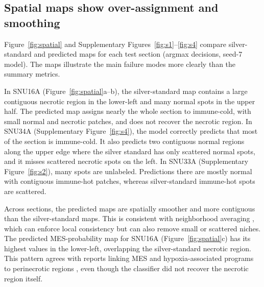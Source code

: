 \documentclass[11pt,letterpaper]{article}
\begin{document}
\subsection{Spatial maps show over-assignment and smoothing}

Figure~\ref{fig:spatial} and Supplementary Figures~\ref{fig:s1}--\ref{fig:s4} compare silver-standard and predicted maps for each test section (argmax decisions, seed-7 model). The maps illustrate the main failure modes more clearly than the summary metrics.

In SNU16A (Figure~\ref{fig:spatial}a--b), the silver-standard map contains a large contiguous necrotic region in the lower-left and many normal spots in the upper half. The predicted map assigns nearly the whole section to immune-cold, with small normal and necrotic patches, and does not recover the necrotic region. In SNU34A (Supplementary Figure~\ref{fig:s4}), the model correctly predicts that most of the section is immune-cold. It also predicts two contiguous normal regions along the upper edge where the silver standard has only scattered normal spots, and it misses scattered necrotic spots on the left. In SNU33A (Supplementary Figure~\ref{fig:s2}), many spots are unlabeled. Predictions there are mostly normal with contiguous immune-hot patches, whereas silver-standard immune-hot spots are scattered.

Across sections, the predicted maps are spatially smoother and more contiguous than the silver-standard maps. This is consistent with neighborhood averaging \cite{li2018deeper}, which can enforce local consistency but can also remove small or scattered niches. The predicted MES-probability map for SNU16A (Figure~\ref{fig:spatial}c) has its highest values in the lower-left, overlapping the silver-standard necrotic region. This pattern agrees with reports linking MES and hypoxia-associated programs to perinecrotic regions \cite{greenwald2024,neftel2019}, even though the classifier did not recover the necrotic region itself.
\end{document}
